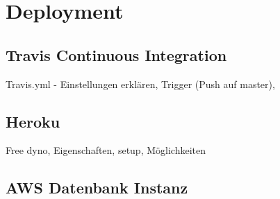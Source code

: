 \section{Deployment} \thispagestyle{nomarkstyle}
\subsection{Travis Continuous Integration}
Travis.yml - Einstellungen erklären, Trigger (Push auf master), 

\subsection{Heroku}
Free dyno, Eigenschaften, setup, Möglichkeiten

\subsection{AWS Datenbank Instanz}
